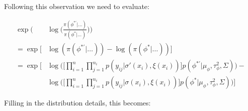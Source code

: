 \documentclass{article}
\begin{document}
Following this observation we need to evaluate:

\begin{align*}
\exp \bigg( & \log \bigg (\frac{\pi(\phi^{*'} | \dots ) }{ \pi(\phi^* | \dots ) } \bigg) \bigg) \\
= \exp \big[ & \log(\pi(\phi^{*'} | \dots )) - \log(\pi(\phi^* | \dots )) \big] \\
= \exp \Big[ & \log \Big( \Big[ \prod_{i=1}^n \prod_{j=1}^{n_i} p(y_{ij} | \sigma'(x_i), \xi(x_i)) \Big] p(\phi^{*'} | \mu_\phi, \tau^2_\phi, \Sigma) \Big) - \\
& \log \Big( \Big[ \prod_{i=1}^n \prod_{j=1}^{n_i} p(y_{ij} | \sigma(x_i), \xi(x_i)) \Big] p(\phi^* | \mu_\phi, \tau^2_\phi, \Sigma) \Big) \Big]
\end{align*}

Filling in the distribution details, this becomes:
\end{document}
